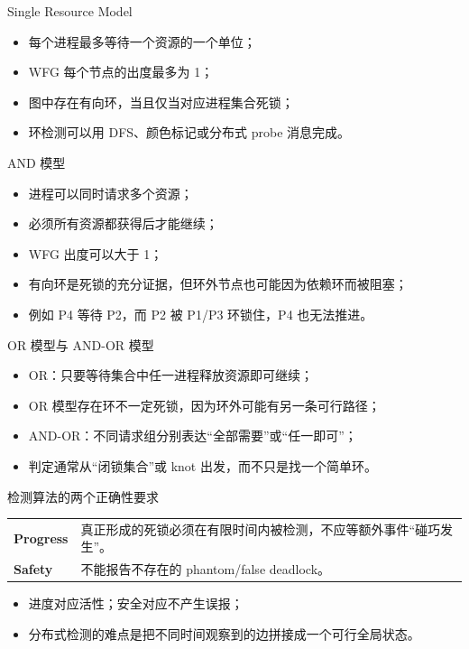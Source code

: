 \documentclass[UTF8,fontset=none,aspectratio=169,10pt]{beamer}
\begin{document}
\begin{frame}{Single Resource Model}
\begin{itemize}
  \item 每个进程最多等待一个资源的一个单位；
  \item WFG 每个节点的出度最多为 1；
  \item 图中存在有向环，当且仅当对应进程集合死锁；
  \item 环检测可以用 DFS、颜色标记或分布式 probe 消息完成。
\end{itemize}
\vfill
{}
\end{frame}

\begin{frame}{AND 模型}
\begin{itemize}
  \item 进程可以同时请求多个资源；
  \item 必须所有资源都获得后才能继续；
  \item WFG 出度可以大于 1；
  \item 有向环是死锁的充分证据，但环外节点也可能因为依赖环而被阻塞；
  \item 例如 P4 等待 P2，而 P2 被 P1/P3 环锁住，P4 也无法推进。
\end{itemize}
\end{frame}

\begin{frame}{OR 模型与 AND-OR 模型}
\begin{itemize}
  \item OR：只要等待集合中任一进程释放资源即可继续；
  \item OR 模型存在环不一定死锁，因为环外可能有另一条可行路径；
  \item AND-OR：不同请求组分别表达“全部需要”或“任一即可”；
  \item 判定通常从“闭锁集合”或 knot 出发，而不只是找一个简单环。
\end{itemize}
\vfill
{}
\end{frame}

\begin{frame}{检测算法的两个正确性要求}
\begin{tabularx}{\linewidth}{>{\bfseries}p{2.8cm}X}
\toprule
Progress & 真正形成的死锁必须在有限时间内被检测，不应等额外事件“碰巧发生”。 \\
Safety & 不能报告不存在的 phantom/false deadlock。 \\
\bottomrule
\end{tabularx}
\vfill
\begin{itemize}
  \item 进度对应活性；安全对应不产生误报；
  \item 分布式检测的难点是把不同时间观察到的边拼接成一个可行全局状态。
\end{itemize}
\end{frame}
\end{document}
